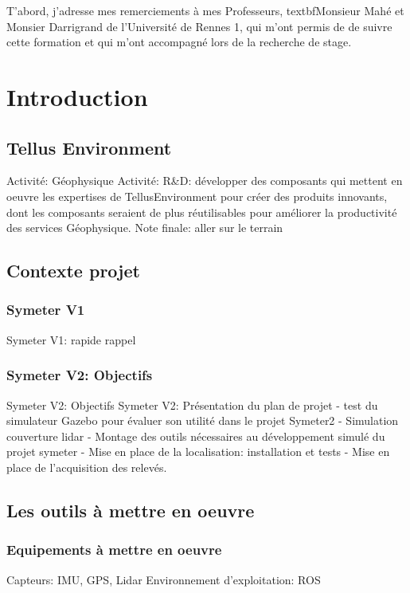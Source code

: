 \documentclass[12pt,a4paper]{report}
\begin{document}
T'abord, j'adresse mes remerciements à mes Professeurs, textbf{Monsieur Mahé et Monsier Darrigrand de l'Université de Rennes 1}, qui m'ont permis de de suivre cette formation et qui m'ont accompagné lors de la recherche de stage.

\lipsum[1]

\chapter{Introduction}

	\section{Tellus Environment}
Activité: Géophysique
Activité: R\&D: développer des composants qui mettent en oeuvre les expertises de TellusEnvironment pour créer des produits innovants, dont les composants seraient de plus réutilisables pour améliorer la productivité des services Géophysique.
Note finale: aller sur le terrain

	\section{Contexte projet}
	\lipsum[3]
		\subsection{Symeter V1}
		
		Symeter V1: rapide rappel
		
		\lipsum[39]
		
		\subsection{Symeter V2: Objectifs}
		Symeter V2: Objectifs
		Symeter V2: Présentation du plan de projet
- test du simulateur Gazebo pour évaluer son utilité dans le projet Symeter2
- Simulation couverture lidar
- Montage des outils nécessaires au développement simulé du projet symeter
- Mise en place de la localisation: installation et tests
- Mise en place de l'acquisition des relevés.

	\section{Les outils à mettre en oeuvre}
		\subsection{Equipements à mettre en oeuvre}
Capteurs: IMU, GPS, Lidar
Environnement d'exploitation: ROS
\end{document}
